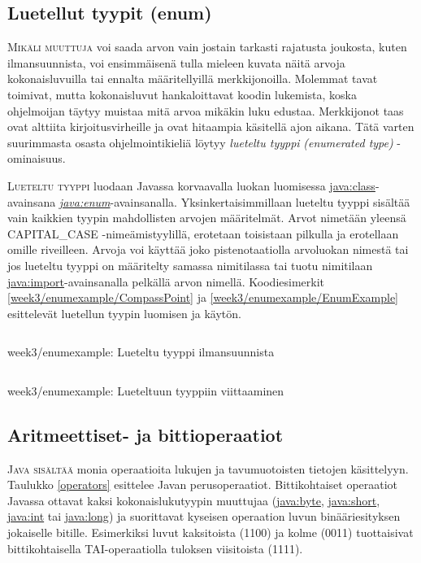 \documentclass[openany]{book}
\newcommand{\newthought}[1]{\smallskip\textsc{#1}}
\newcommand{\eng}[1]{\textit{(#1)}}
\newcommand{\new}[1]{\textit{\gls{#1}}}
\newcommand{\neweng}[2]{\new{#1} \eng{#2}}
\newcommand{\java}[1]{\underline{\gls{java:#1}}}
\newcommand{\newjava}[1]{\textit{\java{#1}}}
\newcommand{\code}[3]{
	\begin{listing}
		\linespread{0.85}
		\inputminted{java}{OhjelmointiopasEsimerkit/src/#1/#2.java}
		\caption{#1: #3}
		\label{#1/#2}
	\end{listing}
}
\begin{document}
\subsection{Luetellut tyypit (enum)}
\label{enum}

\newthought{Mikäli muuttuja} voi saada arvon vain jostain tarkasti rajatusta joukosta, kuten
ilmansuunnista, voi ensimmäisenä tulla mieleen kuvata näitä arvoja kokonaisluvuilla tai ennalta
määritellyillä merkkijonoilla. Molemmat tavat toimivat, mutta kokonaisluvut hankaloittavat koodin
lukemista, koska ohjelmoijan täytyy muistaa mitä arvoa mikäkin luku edustaa. Merkkijonot taas ovat
alttiita kirjoitusvirheille ja ovat hitaampia käsitellä ajon aikana. Tätä varten suurimmasta
osasta ohjelmointikieliä löytyy \neweng{lueteltu tyyppi}{enumerated type} -ominaisuus.

\newthought{Lueteltu tyyppi} luodaan Javassa korvaavalla luokan luomisessa \java{class}-avainsana
\newjava{enum}-avainsanalla. Yksinkertaisimmillaan lueteltu tyyppi sisältää vain kaikkien tyypin
mahdollisten arvojen määritelmät. Arvot nimetään yleensä CAPITAL\_CASE -nimeämistyylillä,
erotetaan toisistaan pilkulla ja erotellaan omille riveilleen. Arvoja voi käyttää joko
pistenotaatiolla arvoluokan nimestä tai jos lueteltu tyyppi on määritelty samassa nimitilassa
tai tuotu nimitilaan \java{import}-avainsanalla pelkällä arvon nimellä. Koodiesimerkit
\ref{week3/enumexample/CompassPoint} ja \ref{week3/enumexample/EnumExample} esittelevät luetellun
tyypin luomisen ja käytön.

\code{week3/enumexample}{CompassPoint}{Lueteltu tyyppi ilmansuunnista}
\code{week3/enumexample}{EnumExample}{Lueteltuun tyyppiin viittaaminen}

\subsection{Aritmeettiset- ja bittioperaatiot}
\label{operaatiot}

\newthought{Java sisältää} monia operaatioita lukujen ja tavumuotoisten tietojen käsittelyyn.
Taulukko \ref{operators} esittelee Javan perusoperaatiot. Bittikohtaiset operaatiot Javassa
ottavat kaksi kokonaislukutyypin muuttujaa (\java{byte}, \java{short}, \java{int} tai \java{long})
ja suorittavat kyseisen operaation luvun binääriesityksen jokaiselle bitille. Esimerkiksi luvut
kaksitoista (1100) ja kolme (0011) tuottaisivat bittikohtaisella TAI-operaatiolla tuloksen
viisitoista (1111).
\end{document}

